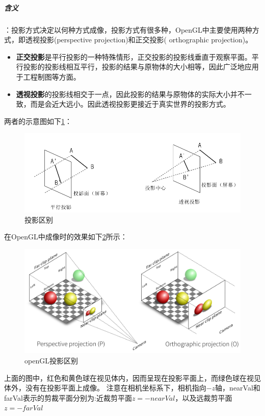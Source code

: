 \documentclass[UTF8,a4paper,8pt]{ctexbook}
\begin{document}
			\subparagraph{含义}：投影方式决定以何种方式成像，投影方式有很多种，OpenGL中主要使用两种方式，即透视投影(perspective projection)和正交投影( orthographic projection)。
			\begin{itemize}[itemindent = 1em]
				\item \textbf{正交投影}是平行投影的一种特殊情形，正交投影的投影线垂直于观察平面。平行投影的投影线相互平行，投影的结果与原物体的大小相等，因此广泛地应用于工程制图等方面。 
				\item \textbf{透视投影}的投影线相交于一点，因此投影的结果与原物体的实际大小并不一致，而是会近大远小。因此透视投影更接近于真实世界的投影方式。
			\end{itemize}
			两者的示意图如下\ref{tyqb}：
			\begin{figure}[htbp]
				\centering
				\includegraphics[scale = 0.7]{project.png}
				\caption{投影区别}
				\label{tyqb}
			\end{figure}
			在OpenGL中成像时的效果如下\ref{touyingqubie}所示：
			   \begin{figure}[htbp]
			   	\centering
			   	\includegraphics[scale = 0.7]{project2.png}
			   	\caption{openGL投影区别}
			   	\label{touyingqubie}
			   \end{figure}
			上面的图中，红色和黄色球在视见体内，因而呈现在投影平面上，而绿色球在视见体外，没有在投影平面上成像。  注意在相机坐标系下，相机指向$-z$轴，nearVal和farVal表示的剪裁平面分别为:近裁剪平面$z=−nearVal$，以及远裁剪平面$z=−farVal$ 
			
\end{document}
